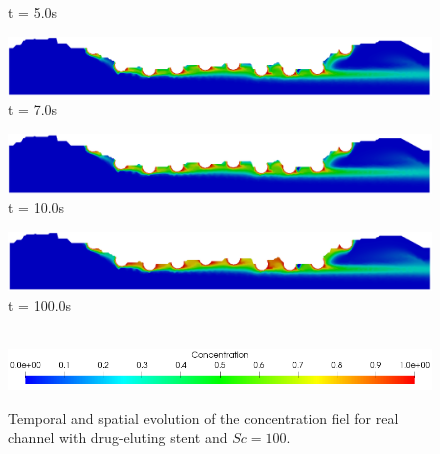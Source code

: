 \begin{figure}[H]
\begin{minipage}{.50\linewidth}
      t = 5.0s
     \end{minipage}%
     \begin{minipage}{.50\linewidth}
      \centering
      \includegraphics[scale=0.18]{./02_chaps/cap_solution/figure/conc100_RealStrut6.png}\\
      t = 7.0s
     \end{minipage}
     \begin{minipage}{.50\linewidth}
     \medskip
      \centering
      \includegraphics[scale=0.18]{./02_chaps/cap_solution/figure/conc100_RealStrut7.png}\\
      t = 10.0s
     \end{minipage}%
     \begin{minipage}{.50\linewidth}
     \medskip
      \centering
      \includegraphics[scale=0.18]{./02_chaps/cap_solution/figure/conc100_RealStrut8.png}\\
      t = 100.0s
     \end{minipage}\\[10pt]
      \centering
      \includegraphics[scale=0.5]{./02_chaps/cap_solution/figure/conc1_RealStrutScale.png}\\
     \medskip
    \caption{
Temporal and spatial evolution of the concentration fiel for real channel with drug-eluting stent and $Sc=100$.}
     \label{conc field real stent sc 100}
\end{figure}


